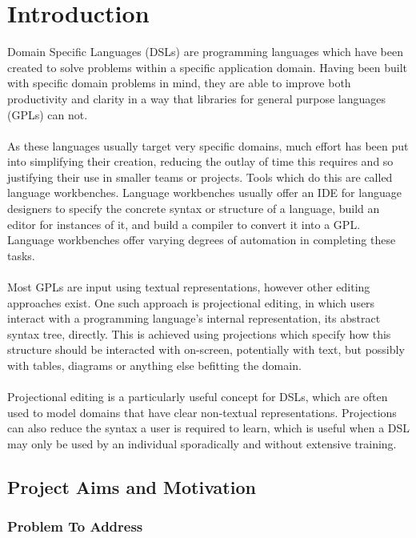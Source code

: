 \documentclass{article}
\begin{document}
\clearpage
\tableofcontents
\clearpage

\section{Introduction}

Domain Specific Languages (DSLs) are programming languages which have been created to solve problems within a specific application domain. Having been built with specific domain problems in mind, they are able to improve both productivity and clarity in a way that libraries for general purpose languages (GPLs) can not. 
\\
\\
As these languages usually target very specific domains, much effort has been put into simplifying their creation, reducing the outlay of time this requires and so justifying their use in smaller teams or projects. Tools which do this are called language workbenches. Language workbenches usually offer an IDE for language designers to specify the concrete syntax or structure of a language, build an editor for instances of it, and build a compiler to convert it into a GPL. Language workbenches offer varying degrees of automation in completing these tasks.
\\
\\
Most GPLs are input using textual representations, however other editing approaches exist. One such approach is projectional editing, in which users interact with a programming language's internal representation, its abstract syntax tree, directly. This is achieved using projections which specify how this structure should be interacted with on-screen, potentially with text, but possibly with tables, diagrams or anything else befitting the domain. 
\\
\\
Projectional editing is a particularly useful concept for DSLs, which are often used to model domains that have clear non-textual representations. Projections can also reduce the syntax a user is required to learn, which is useful when a DSL may only be used by an individual sporadically and without extensive training.

\subsection{Project Aims and Motivation}

\subsubsection{Problem To Address}\label{problem}
\end{document}
